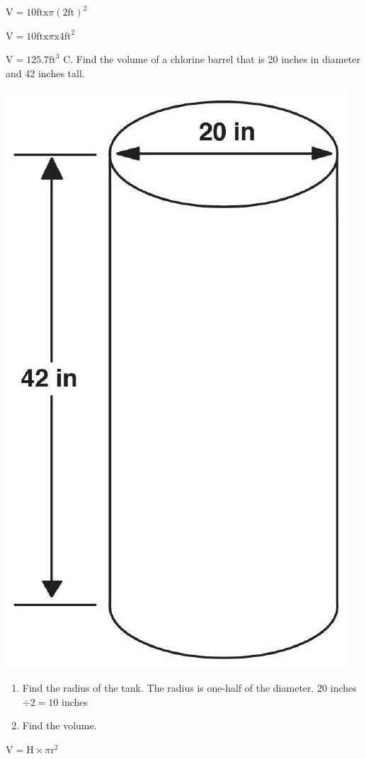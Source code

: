 \documentclass[10pt]{article}
\begin{document}
$\mathrm{V}=10 \mathrm{ft} \mathrm{x} \pi(2 \mathrm{ft})^{2}$

$\mathrm{V}=10 \mathrm{ft} \mathrm{x} \pi \mathrm{x} 4 \mathrm{ft}^{2}$

$\mathrm{V}=125.7 \mathrm{ft}^{3}$ C. Find the volume of a chlorine barrel that is 20 inches in diameter and 42 inches tall.

\includegraphics[max width=\textwidth]{2022_09_11_72dbedc910e6e984560cg-64}

\begin{enumerate}
  \item Find the radius of the tank. The radius is one-half of the diameter. 20 inches $\div 2=10$ inches

  \item Find the volume.

\end{enumerate}
$\mathrm{V}=\mathrm{H} \times \pi \mathrm{r}^{2}$
\end{document}
